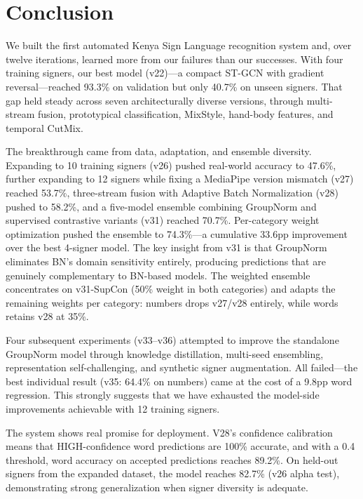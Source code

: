 \documentclass[conference]{IEEEtran}
\begin{document}
\section{Conclusion}

We built the first automated Kenya Sign Language recognition system and, over twelve iterations, learned more from our failures than our successes. With four training signers, our best model (v22)---a compact ST-GCN with gradient reversal---reached 93.3\% on validation but only 40.7\% on unseen signers. That gap held steady across seven architecturally diverse versions, through multi-stream fusion, prototypical classification, MixStyle, hand-body features, and temporal CutMix.

The breakthrough came from data, adaptation, and ensemble diversity. Expanding to 10 training signers (v26) pushed real-world accuracy to 47.6\%, further expanding to 12 signers while fixing a MediaPipe version mismatch (v27) reached 53.7\%, three-stream fusion with Adaptive Batch Normalization (v28) pushed to 58.2\%, and a five-model ensemble combining GroupNorm and supervised contrastive variants (v31) reached 70.7\%. Per-category weight optimization pushed the ensemble to 74.3\%---a cumulative 33.6pp improvement over the best 4-signer model. The key insight from v31 is that GroupNorm eliminates BN's domain sensitivity entirely, producing predictions that are genuinely complementary to BN-based models. The weighted ensemble concentrates on v31-SupCon (50\% weight in both categories) and adapts the remaining weights per category: numbers drops v27/v28 entirely, while words retains v28 at 35\%.

Four subsequent experiments (v33--v36) attempted to improve the standalone GroupNorm model through knowledge distillation, multi-seed ensembling, representation self-challenging, and synthetic signer augmentation. All failed---the best individual result (v35: 64.4\% on numbers) came at the cost of a 9.8pp word regression. This strongly suggests that we have exhausted the model-side improvements achievable with 12 training signers.

The system shows real promise for deployment. V28's confidence calibration means that HIGH-confidence word predictions are 100\% accurate, and with a 0.4 threshold, word accuracy on accepted predictions reaches 89.2\%. On held-out signers from the expanded dataset, the model reaches 82.7\% (v26 alpha test), demonstrating strong generalization when signer diversity is adequate.
\end{document}

